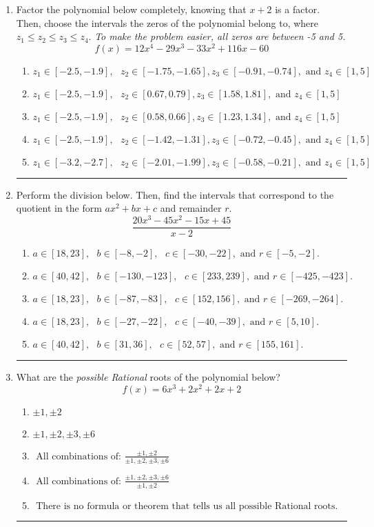 \documentclass[14pt]{extbook}
\newcommand{\litem}[1]{\item#1\hspace*{-1cm}\rule{\textwidth}{0.4pt}}
\begin{document}
\begin{enumerate}
{\begin{enumerate}[label=\Alph*.]
\end{enumerate} }
\litem{
Factor the polynomial below completely, knowing that $x + 2$ is a factor. Then, choose the intervals the zeros of the polynomial belong to, where $z_1 \leq z_2 \leq z_3 \leq z_4$. \textit{To make the problem easier, all zeros are between -5 and 5.}\[ f(x) = 12x^{4} -29 x^{3} -33 x^{2} +116 x -60 \]\begin{enumerate}[label=\Alph*.]
\item \( z_1 \in [-2.5, -1.9], \text{   }  z_2 \in [-1.75, -1.65], z_3 \in [-0.91, -0.74], \text{   and   } z_4 \in [1, 5] \)
\item \( z_1 \in [-2.5, -1.9], \text{   }  z_2 \in [0.67, 0.79], z_3 \in [1.58, 1.81], \text{   and   } z_4 \in [1, 5] \)
\item \( z_1 \in [-2.5, -1.9], \text{   }  z_2 \in [0.58, 0.66], z_3 \in [1.23, 1.34], \text{   and   } z_4 \in [1, 5] \)
\item \( z_1 \in [-2.5, -1.9], \text{   }  z_2 \in [-1.42, -1.31], z_3 \in [-0.72, -0.45], \text{   and   } z_4 \in [1, 5] \)
\item \( z_1 \in [-3.2, -2.7], \text{   }  z_2 \in [-2.01, -1.99], z_3 \in [-0.58, -0.21], \text{   and   } z_4 \in [1, 5] \)

\end{enumerate} }
\litem{
Perform the division below. Then, find the intervals that correspond to the quotient in the form $ax^2+bx+c$ and remainder $r$.\[ \frac{20x^{3} -45 x^{2} -15 x + 45}{x -2} \]\begin{enumerate}[label=\Alph*.]
\item \( a \in [18, 23], \text{   } b \in [-8, -2], \text{   } c \in [-30, -22], \text{   and   } r \in [-5, -2]. \)
\item \( a \in [40, 42], \text{   } b \in [-130, -123], \text{   } c \in [233, 239], \text{   and   } r \in [-425, -423]. \)
\item \( a \in [18, 23], \text{   } b \in [-87, -83], \text{   } c \in [152, 156], \text{   and   } r \in [-269, -264]. \)
\item \( a \in [18, 23], \text{   } b \in [-27, -22], \text{   } c \in [-40, -39], \text{   and   } r \in [5, 10]. \)
\item \( a \in [40, 42], \text{   } b \in [31, 36], \text{   } c \in [52, 57], \text{   and   } r \in [155, 161]. \)

\end{enumerate} }
\litem{
What are the \textit{possible Rational} roots of the polynomial below?\[ f(x) = 6x^{3} +2 x^{2} +2 x + 2 \]\begin{enumerate}[label=\Alph*.]
\item \( \pm 1,\pm 2 \)
\item \( \pm 1,\pm 2,\pm 3,\pm 6 \)
\item \( \text{ All combinations of: }\frac{\pm 1,\pm 2}{\pm 1,\pm 2,\pm 3,\pm 6} \)
\item \( \text{ All combinations of: }\frac{\pm 1,\pm 2,\pm 3,\pm 6}{\pm 1,\pm 2} \)
\item \( \text{ There is no formula or theorem that tells us all possible Rational roots.} \)


\end{enumerate}}
\end{enumerate}
\end{document}
